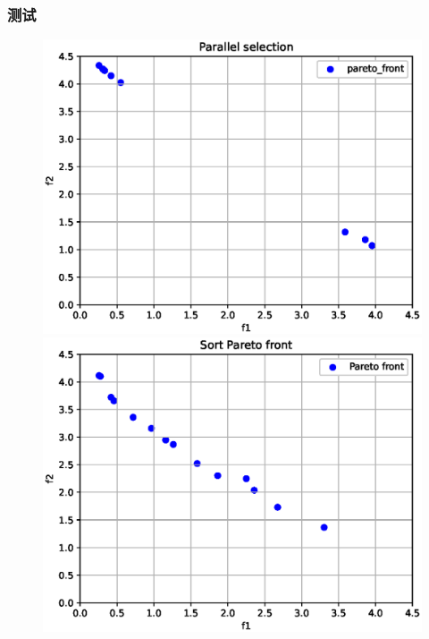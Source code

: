 \documentclass{beamer}
\begin{document}
\begin{frame}
	\frametitle{测试}
	\begin{figure}[htbp]
		\begin{minipage}{0.49\linewidth}
			\centering
			\includegraphics[scale=0.3]{parallel.eps}
		\end{minipage}
		\begin{minipage}{0.49\linewidth}
			\includegraphics[scale=0.3]{sort.eps}
			\centering
		\end{minipage}
		\qquad
		\begin{minipage}{0.49\linewidth}

\end{minipage}
\end{figure}
\end{frame}
\end{document}
